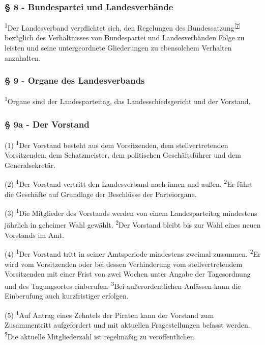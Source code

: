 \subsubsection{§ 8 - Bundespartei und Landesverbände}

\textsuperscript{1}Der Landesverband verpflichtet sich, den Regelungen
des Bundessatzung\textsuperscript{\href{\#cite\_note-6}{{[}7{]}}}
bezüglich des Verhältnisses von Bundespartei und Landesverbänden Folge
zu leisten und seine untergeordnete Gliederungen zu ebensolchem
Verhalten anzuhalten.

\subsubsection{§ 9 - Organe des Landesverbands}

\textsuperscript{1}Organe sind der Landesparteitag, das
Landesschiedsgericht und der Vorstand.

\subsubsection{§ 9a - Der Vorstand}

(1) \textsuperscript{1}Der Vorstand besteht aus dem Vorsitzenden, dem
stellvertretenden Vorsitzenden, dem Schatzmeister, dem politischen
Geschäftsführer und dem Generalsekretär.

(2) \textsuperscript{1}Der Vorstand vertritt den Landesverband nach
innen und außen. \textsuperscript{2}Er führt die Geschäfte auf Grundlage
der Beschlüsse der Parteiorgane.

(3) \textsuperscript{1}Die Mitglieder des Vorstands werden von einem
Landesparteitag mindestens jährlich in geheimer Wahl gewählt.
\textsuperscript{2}Der Vorstand bleibt bis zur Wahl eines neuen
Vorstands im Amt.

(4) \textsuperscript{1}Der Vorstand tritt in seiner Amtsperiode
mindestens zweimal zusammen. \textsuperscript{2}Er wird vom Vorsitzenden
oder bei dessen Verhinderung vom stellvertretendem Vorsitzenden mit
einer Frist von zwei Wochen unter Angabe der Tagesordnung und des
Tagungsortes einberufen. \textsuperscript{3}Bei außerordentlichen
Anlässen kann die Einberufung auch kurzfristiger erfolgen.

(5) \textsuperscript{1}Auf Antrag eines Zehntels der Piraten kann der
Vorstand zum Zusammentritt aufgefordert und mit aktuellen
Fragestellungen befasst werden. \textsuperscript{2}Die aktuelle
Mitgliederzahl ist regelmäßig zu veröffentlichen.

